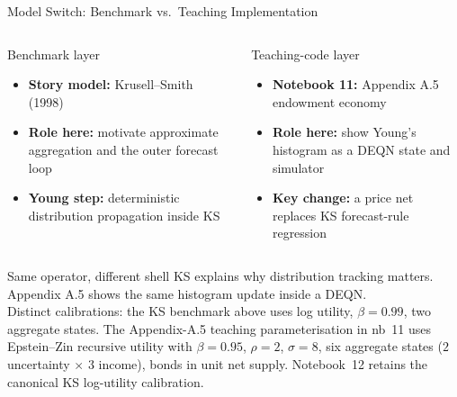 \documentclass[aspectratio=169,11pt]{beamer}
\newcommand{\emphc}[1]{\textcolor{harvardcrimson}{#1}}
\begin{document}
\begin{frame}{Model Switch: Benchmark vs.\ Teaching Implementation}
\footnotesize
\begin{columns}[T]
\begin{block}{Benchmark layer}
\begin{itemize}\itemsep1pt
    \item \textbf{Story model:} Krusell--Smith (1998)
    \item \textbf{Role here:} motivate approximate aggregation and the outer forecast loop
    \item \textbf{Young step:} deterministic distribution propagation inside KS
\end{itemize}
\end{block}

\begin{block}{Teaching-code layer}
\begin{itemize}\itemsep1pt
    \item \textbf{Notebook 11:} Appendix A.5 endowment economy
    \item \textbf{Role here:} show Young's histogram as a DEQN state and simulator
    \item \textbf{Key change:} a price net replaces KS forecast-rule regression
\end{itemize}
\end{block}
\end{columns}

\vspace{0.25em}
\begin{alertblock}{Same operator, different shell}
KS explains \emphc{why} distribution tracking matters. Appendix A.5 shows the same histogram update \emphc{inside} a DEQN.\\[2pt]
\emphc{Distinct calibrations}: the KS benchmark above uses log utility, $\beta=0.99$, two aggregate states.  The Appendix-A.5 teaching parameterisation in nb~11 uses Epstein--Zin recursive utility with $\beta=0.95$, $\rho=2$, $\sigma=8$, six aggregate states ($2$ uncertainty $\times$ $3$ income), bonds in unit net supply.  Notebook~12 retains the canonical KS log-utility calibration.
\end{alertblock}
\end{frame}
\end{document}
